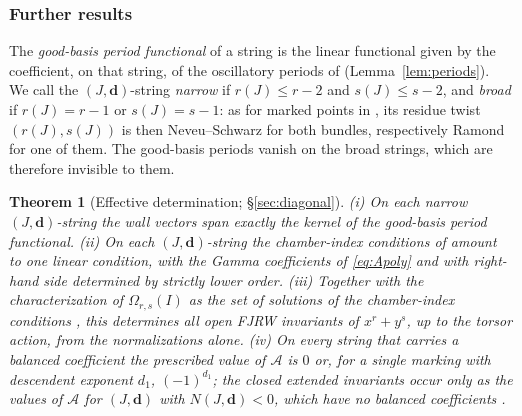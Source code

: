 \documentclass[11pt]{amsart}
\newtheorem{theorem}{Theorem}[section]
\theoremstyle{definition}
\theoremstyle{remark}
\newcommand{\Ascr}{\mathcal{A}}
\newcommand{\Om}{\Omega_{r,s}}
\begin{document}
\subsubsection*{Further results}
The \emph{good-basis period functional} of a string is the linear functional
given by the coefficient, on that string, of the oscillatory periods of
\cite[Thm.~0.3]{GKT} (Lemma~\ref{lem:periods}).  We call the
$(J,\mathbf d)$-string \emph{narrow} if $r(J)\le r-2$ and $s(J)\le s-2$, and
\emph{broad} if $r(J)=r-1$ or $s(J)=s-1$: as for marked points in
\cite[\S1.1]{GKT}, its residue twist $(r(J),s(J))$ is then Neveu--Schwarz for
both bundles, respectively Ramond for one of them.  The good-basis periods
vanish on the broad strings, which are therefore invisible to them.

\begin{theorem}[Effective determination; \S\ref{sec:diagonal}]
\label{thm:effective}
(i) On each narrow $(J,\mathbf d)$-string the wall vectors span exactly
the kernel of the good-basis period functional.  (ii) On each
$(J,\mathbf d)$-string the chamber-index conditions of \cite{GKT} amount to
one linear condition, with the Gamma coefficients of \eqref{eq:Apoly} and
with right-hand side determined by strictly lower order.  (iii) Together with
the characterization of $\Om(I)$ as the set of solutions of the chamber-index
conditions \cite[Cor.~5.14]{GKT}, this determines all open FJRW invariants of
$x^{r}+y^{s}$, up to the torsor action, from the normalizations alone.  (iv) On
every string that carries a balanced coefficient the prescribed value of
$\Ascr$ is $0$ or, for a single marking with descendent exponent $d_1$,
$(-1)^{d_1}$; the closed extended invariants occur only as the values of
$\Ascr$ for $(J,\mathbf d)$ with $N(J,\mathbf d)<0$, which have no balanced
coefficients \cite[Cor.~5.11(3)]{GKT}.
\end{theorem}
\end{document}
